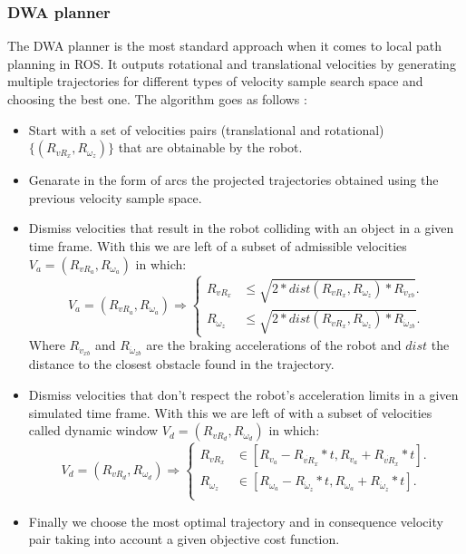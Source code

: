 \subsubsection{DWA planner}\label{dwa}
The \ac{DWA} planner is the most standard approach when it comes to local path planning in \ac{ROS}. It outputs  rotational and translational velocities by generating multiple trajectories for different types of velocity sample search space and choosing the best one. The algorithm goes as follows \cite{inbookdwa}:
\begin{itemize}
    \item Start with a set of velocities pairs (translational and rotational) $\{(R_{vR_x},R_{ \omega_z}  )\}$ that are obtainable by the robot.
    \item Genarate in the form of arcs the projected trajectories obtained using the previous velocity sample space.
    \item Dismiss velocities that result in the robot colliding with an object in a given time frame. With this we are left of a subset of admissible velocities $V_a=(R_{vR_a},R_{ \omega_a})$ in which:
    \begin{equation}
         V_a=(R_{vR_a},R_{ \omega_a}) \Rightarrow \begin{cases}
    R_{vR_x} & 	\leq \sqrt{2*dist(R_{vR_x},R_{ \omega_z})*R_{\dot{v}_{xb}}}.\\
    R_{ \omega_z}  &  	\leq \sqrt{2*dist(R_{vR_x},R_{ \omega_z})*R_{\dot{\omega}_{zb}}}.
  \end{cases}
    \end{equation}
    Where $R_{\dot{v}_{xb}}$ and $R_{\dot{\omega}_{zb}}$ are the braking accelerations of the robot and $dist$ the distance to the closest obstacle found in the trajectory.
    
    
    \item Dismiss velocities that don't respect the robot's acceleration limits in a given simulated time frame. With this we are left of with a subset of velocities called dynamic window $V_d=(R_{vR_d},R_{ \omega_d})$  in which:
    \begin{equation}
         V_d=(R_{vR_d},R_{ \omega_d}) \Rightarrow \begin{cases}
    R_{vR_x} & 	\in [R_{v_a}-R_{\dot{vR}_{x}}*t,R_{v_a} + R_{\dot{vR}_{x}}*t].\\
    R_{\omega_z} & 	\in [R_{ \omega_a}-R_{\dot{\omega}_{z}}*t,R_{\omega_a}+R_{\dot{\omega}_{z}}*t].\\
  \end{cases}
    \end{equation}
    \item Finally we choose  the most optimal trajectory and in consequence velocity pair taking into account a given objective cost function.
    \end{itemize}
